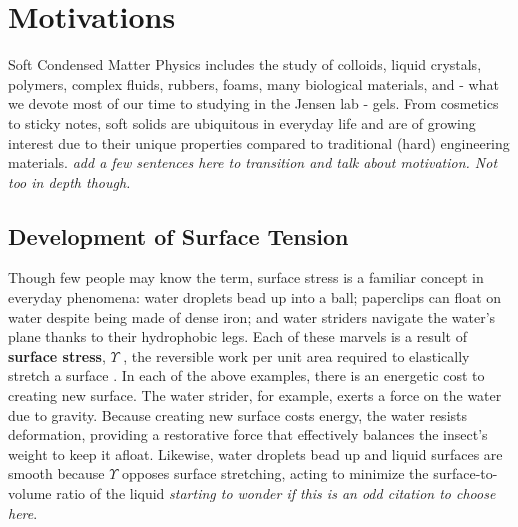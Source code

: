 

\section{Motivations}
Soft Condensed Matter Physics includes the study of colloids, liquid crystals, polymers, complex fluids, rubbers, foams, many biological materials, and - what we devote most of our time to studying in the Jensen lab - gels. From cosmetics to sticky notes, soft solids are ubiquitous in everyday life and are of growing interest due to their unique properties compared to traditional (hard) engineering materials. \emph{add a few sentences here to transition and talk about motivation. Not too in depth though.}

\subsection{Development of Surface Tension}
Though few people may know the term, surface stress is a familiar concept in everyday phenomena: water droplets bead up into a ball; paperclips can float on water despite being made of dense iron; and water striders navigate the water's plane thanks to their hydrophobic legs. Each of these marvels is a result of \textbf{surface stress}, $\Upsilon$ , the reversible work per unit area required to elastically stretch a surface \cite{cammarata1994surface}. In each of the above examples, there is an energetic cost to creating new surface. The water strider, for example, exerts a force on the water due to gravity. Because creating new surface costs energy, the water resists deformation, providing a restorative force that effectively balances the insect’s weight to keep it afloat.  Likewise, water droplets bead up and liquid surfaces are smooth because $\Upsilon$ opposes surface stretching, acting to minimize the surface-to-volume ratio of the liquid \cite{gibbs1906scientific} \emph{starting to wonder if this is an odd citation to choose here}.

